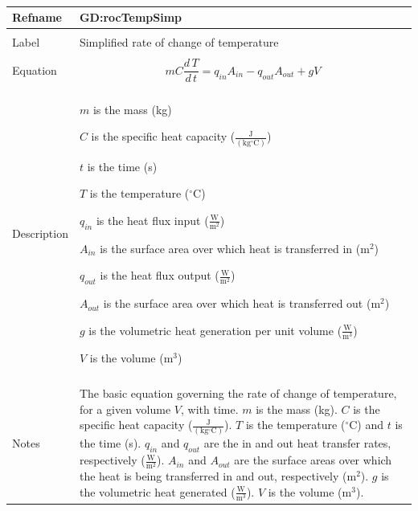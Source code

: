 \documentclass[12pt]{article}
\begin{document}
~\newline
\noindent \begin{minipage}{\textwidth}
\begin{tabular}{p{} p{}}
\toprule \textbf{Refname} & \textbf{GD:rocTempSimp}
\label{GD:rocTempSimp}
\\ \midrule \\
Label & Simplified rate of change of temperature
\\ \midrule \\
Equation & \begin{dmath}
           m C \frac{d\,T}{d\,t}={q_{in}} {A_{in}}-{q_{out}} {A_{out}}+g V
           \end{dmath}
\\ \midrule \\
Description & \begin{symbDescription}
              \item{$m$ is the mass (kg)}
              \item{$C$ is the specific heat capacity ($\frac{\text{J}}{(\text{kg}{}^{\circ}\text{C})}$)}
              \item{$t$ is the time (s)}
              \item{$T$ is the temperature (${}^{\circ}$C)}
              \item{${q_{in}}$ is the heat flux input ($\frac{\text{W}}{\text{m}^{2}}$)}
              \item{${A_{in}}$ is the surface area over which heat is transferred in ($\text{m}^{2}$)}
              \item{${q_{out}}$ is the heat flux output ($\frac{\text{W}}{\text{m}^{2}}$)}
              \item{${A_{out}}$ is the surface area over which heat is transferred out ($\text{m}^{2}$)}
              \item{$g$ is the volumetric heat generation per unit volume ($\frac{\text{W}}{\text{m}^{3}}$)}
              \item{$V$ is the volume ($\text{m}^{3}$)}
              \end{symbDescription}
\\ \midrule \\
Notes & The basic equation governing the rate of change of temperature, for a given volume $V$, with time. $m$ is the mass (kg). $C$ is the specific heat capacity ($\frac{\text{J}}{(\text{kg}{}^{\circ}\text{C})}$). $T$ is the temperature (${}^{\circ}$C) and $t$ is the time (s). ${q_{in}}$ and ${q_{out}}$ are the in and out heat transfer rates, respectively ($\frac{\text{W}}{\text{m}^{2}}$). ${A_{in}}$ and ${A_{out}}$ are the surface areas over which the heat is being transferred in and out, respectively ($\text{m}^{2}$). $g$ is the volumetric heat generated ($\frac{\text{W}}{\text{m}^{3}}$). $V$ is the volume ($\text{m}^{3}$).

\end{tabular}
\end{minipage}
\end{document}
